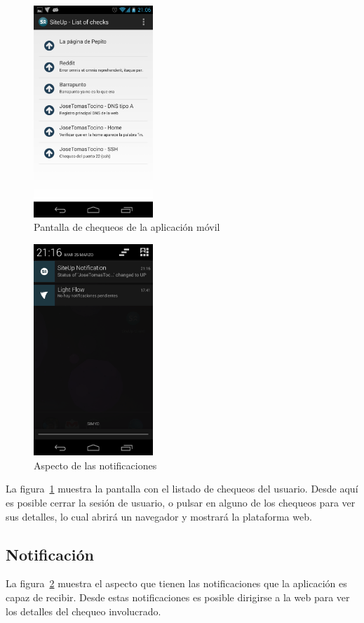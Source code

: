 \begin{figure}[p]
  \centering
  \includegraphics[width=0.4\textwidth]{5_diseno/android-4}
  \caption{Pantalla de chequeos de la aplicación móvil}
  \label{fig:android-dashboard}
\end{figure}

\begin{figure}[p]
  \centering
  \includegraphics[width=0.4\textwidth]{5_diseno/android-5}
  \caption{Aspecto de las notificaciones}
  \label{fig:android-notification}
\end{figure}

La figura~\ref{fig:android-dashboard} muestra la pantalla con el listado de
chequeos del usuario. Desde aquí es posible cerrar la sesión de usuario, o
pulsar en alguno de los chequeos para ver sus detalles, lo cual abrirá un
navegador y mostrará la plataforma web.

\subsection{Notificación}



La figura~\ref{fig:android-notification} muestra el aspecto que tienen las
notificaciones que la aplicación es capaz de recibir. Desde estas notificaciones
es posible dirigirse a la web para ver los detalles del chequeo involucrado.

